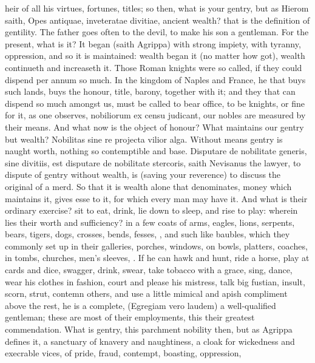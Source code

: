 {heir of all his virtues, fortunes, titles; so then, what is your
gentry, but as Hierom saith, Opes antiquae, inveteratae divitiae,
ancient wealth? that is the definition of gentility. The father goes
often to the devil, to make his son a gentleman. For the present, what
is it? It began (saith Agrippa) with strong impiety, with
tyranny, oppression, \etc{} and so it is maintained: wealth began it (no
matter how got), wealth continueth and increaseth it. Those Roman
knights were so called, if they could dispend per annum so much.
In the kingdom of Naples and France, he that buys such lands,
buys the honour, title, barony, together with it; and they that can
dispend so much amongst us, must be called to bear office, to be
knights, or fine for it, as one observes, nobiliorum ex censu
judicant, our nobles are measured by their means. And what now is the
object of honour? What maintains our gentry but wealth? Nobilitas
sine re projecta vilior alga. Without means gentry is naught worth,
nothing so contemptible and base. Disputare de nobilitate
generis, sine divitiis, est disputare de nobilitate stercoris, saith
Nevisanus the lawyer, to dispute of gentry without wealth, is (saving
your reverence) to discuss the original of a merd. So that it is wealth
alone that denominates, money which maintains it, gives esse to it, for
which every man may have it. And what is their ordinary exercise?
sit to eat, drink, lie down to sleep, and rise to play: wherein
lies their worth and sufficiency? in a few coats of arms, eagles,
lions, serpents, bears, tigers, dogs, crosses, bends, fesses, \etc{}, and
such like baubles, which they commonly set up in their galleries,
porches, windows, on bowls, platters, coaches, in tombs, churches,
men's sleeves, \etc{}. If he can hawk and hunt, ride a horse, play at
cards and dice, swagger, drink, swear, take tobacco with a grace, sing,
dance, wear his clothes in fashion, court and please his mistress, talk
big fustian, insult, scorn, strut, contemn others, and use a
little mimical and apish compliment above the rest, he is a complete,
(Egregiam vero laudem) a well-qualified gentleman; these are most of
their employments, this their greatest commendation. What is gentry,
this parchment nobility then, but as  Agrippa defines it, a
sanctuary of knavery and naughtiness, a cloak for wickedness and
execrable vices, of pride, fraud, contempt, boasting, oppression,
}
